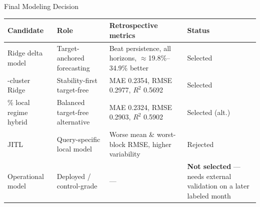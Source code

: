 \documentclass[11pt,aspectratio=169]{beamer}
\begin{document}
\begin{frame}{Final Modeling Decision}
\begin{center}
\scriptsize
\begin{tabular}{L{2.6cm} L{3.4cm} L{4.2cm} L{1.8cm}}
\toprule
\textbf{Candidate} & \textbf{Role} & \textbf{Retrospective metrics} & \textbf{Status} \\
\midrule
Ridge delta model & Target-anchored forecasting & Beat persistence, all horizons, $\approx$19.8\%–34.9\% better & Selected \\
-cluster Ridge & Stability-first target-free & MAE 0.2354, RMSE 0.2977, $R^2$ 0.5692 & Selected \\
\% local regime hybrid & Balanced target-free alternative & MAE 0.2324, RMSE 0.2903, $R^2$ 0.5902 & Selected (alt.) \\
\addlinespace
JITL & Query-specific local model & Worse mean \& worst-block RMSE, higher variability & Rejected \\
\addlinespace
Operational model & Deployed / control-grade & — & \textbf{Not selected} — needs external validation on a later labeled month \\
\bottomrule
\end{tabular}
\end{center}
\end{frame}
\end{document}

